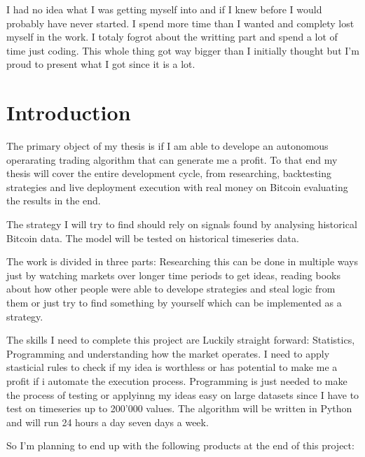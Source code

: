 \documentclass[12pt]{article}
\begin{document}
I had no idea what I was getting myself into and if I knew before I would probably have never started. I spend more time than I wanted and complety lost myself in the work. I totaly fogrot about the writting part and spend a lot of time just coding. This whole thing got way bigger than I initially thought but I'm proud to present what I got since it is a lot.





\clearpage

\tableofcontents
\clearpage

\setcounter{page}{1}
\section{Introduction}
The primary object of my thesis is if I am able to develope an autonomous operarating trading algorithm that can generate me a profit. To that end my thesis will cover the entire development cycle, from researching, backtesting strategies and live deployment execution with real money on Bitcoin evaluating the results in the end.


The strategy I will try to find should rely on  signals found by analysing historical Bitcoin data. The model will be tested on historical timeseries data.

The work is divided in three parts: Researching this can be done in multiple ways just by watching markets over longer time periods to get ideas, reading books about how other people were able to develope strategies and steal logic from them or just try to find something by yourself which can be implemented as a strategy.



The skills I need to complete this project are Luckily straight forward: Statistics, Programming and understanding how the market operates. I need to apply stasticial rules to check if my idea is worthless or has potential to make me a profit if i automate the execution process. Programming is just needed to make the process of testing or applyinng my ideas easy on large datasets since I have to test on timeseries up to 200'000 values. The algorithm will be written in Python and will run 24 hours a day seven days a week.





So I'm planning to end up with the following products at the end of this project:
\end{document}
